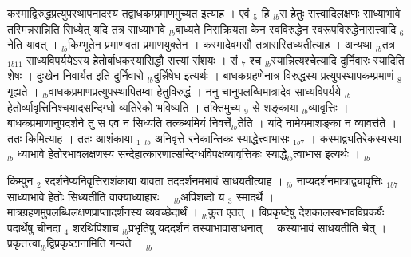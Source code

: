 \documentclass[article,12pt,a4paper]{memoir}%
\newcounter{parCount}
\begin{document}
	  
	  \pstart \leavevmode%
	\hphantom{.}कस्माद्विरुद्धप्रत्युपस्थापनादस्य तद्वाधकम्प्रमाणमुच्यत इत्याह । {\color{DodgerBlue3}एवं {\tiny $_{5}$} हि {\tiny $_{lb}$}स} हेतुः सत्त्वादिलक्षणः साध्याभावे तस्मिन्नसन्निति सिध्येत् यदि तत्र साध्याभावे {\tiny $_{lb}$}बाध्यते निराक्रियता केन स्वविरुद्धेन स्वरूपविरुद्धेनासत्त्वादि {\tiny $_{6}$} नेति यावत् । {\tiny $_{lb}$}किम्भूतेन प्रमाणवता प्रमाणयुक्तेन । कस्मादेवमसौ तत्रासस्तिध्यतीत्याह । {\color{DodgerBlue3}अन्यथा {\tiny $_{lb}$}तत्र {\tiny $_{1b11}$} साध्यविपर्ययेऽस्य हेतोर्बाधकस्यासिद्धौ सत्त्यां संशयः} । सं {\tiny $_{7}$} श्च {\tiny $_{lb}$}स्यान्नित्यश्चेत्यादि दुर्निवारः स्यादिति शेषः । दुःखेन निवार्यत इति दुर्निवारो {\tiny $_{lb}$}दुर्न्निषेध इत्यर्थः । बाधकग्रहणेनात्र विरुद्धस्य प्रत्युपस्थापकम्प्रमाणं {\tiny $_{8}$} गृह्यते । {\tiny $_{lb}$}वाधकप्रमाणप्रत्युपस्थापितम्वा हेतुविरुद्धं । ननु चानुपलब्धिमात्रादेव साध्यविपर्यये {\tiny $_{lb}$}हेतोर्व्यावृत्तिनिश्चयादसन्दिग्धो व्यतिरेको भविष्यति । तक्तिमुच्य {\tiny $_{9}$} \leavevmode{} से शङ्काया {\tiny $_{lb}$}व्यावृत्तिः । बाधकप्रमाणानुपदर्शने तु स एव न सिध्यति तत्कथमियं निवर्त्ते{\tiny $_{lb}$}तेति । यदि नामेयमाशङ्का न व्यावर्त्तते । ततः किमित्याह । ततः आशंकाया {\tiny $_{1}$} {\tiny $_{lb}$} \leavevmode{} अनिवृत्ते {\color{DodgerBlue3}रनेकान्तिकः स्याद्धेत्त्वाभासः} {\tiny $_{1b7}$} । कस्माद्व्यतिरेकस्यस्या {\tiny $_{lb}$} ध्याभावे हेतोरभावलक्षणस्य सन्देहात्कारणात्सन्दिग्धविपक्षव्यावृत्तिकः स्याद्धे{\tiny $_{lb}$}त्वाभास इत्यर्थः ।
	{}
	\pend%
      {\tiny $_{lb}$}

	  
	  \pstart \leavevmode%
	किम्पुन {\tiny $_{2}$} रदर्शनेप्यनिवृत्तिराशंकाया यावता तददर्शनमभावं साधयतीत्याह । {\tiny $_{lb}$} {\color{DodgerBlue3}नाप्यदर्शनमात्राद्व्यावृत्तिः} {\tiny $_{1b7}$} साध्याभावे हेतोः सिध्यतीति वाक्याध्याहारः । {\tiny $_{lb}$}अपिशब्दो य {\tiny $_{3}$} स्मादर्थे । मात्रग्रहणमुपलब्धिलक्षणप्राप्तादर्शनस्य व्यवच्छेदार्थं । {\tiny $_{lb}$}कुत एतत् । विप्रकृष्टेषु देशकालस्वभावविप्रकर्षैः पदार्थेषु चीनदा {\tiny $_{4}$} शरथिपिशाच {\tiny $_{lb}$}प्रभृतिषु यददर्शनं तस्याभावासाधनात् । कस्याभावं साधयतीति चेत् । प्रकृतत्त्वा{\tiny $_{lb}$}द्विप्रकृष्टानामिति गम्यते ।
	{}
	\pend%
      {\tiny $_{lb}$}
\end{document}
